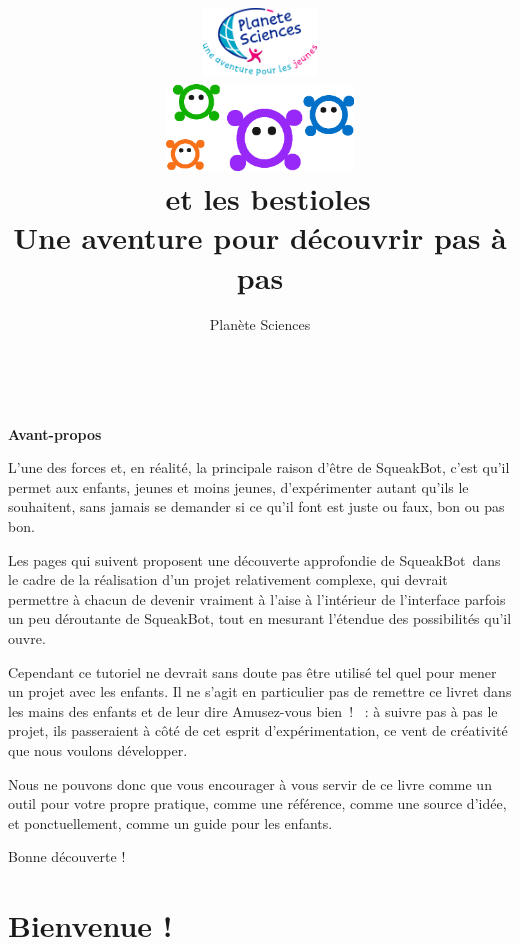 \documentclass[a4paper,12pt]{book}
\title{
	\includegraphics[width=3cm]{national.png}\\
	\vfill
	\includegraphics[width=5cm]{bestioles.png}\\
	\vspace{3em}
	\LARGE{\textbf{\appName~et les bestioles}}\\[1cm]
	\large{Une aventure pour découvrir pas à pas \appName}\\[1cm]
	\vfill
}
\author{
Planète Sciences
}
\def\appName{SqueakBot}
\begin{document}

\maketitle

\tableofcontents


\clearpage
\thispagestyle{empty}
~
\vfill
\begin{center}
    \LARGE{\textbf{Avant-propos}}
\end{center}

\vspace{3em}

L'une des forces et, en réalité, la principale raison d'être de \appName, c'est
qu'il permet aux enfants, jeunes et moins jeunes, d'expérimenter autant qu'ils
le souhaitent, sans jamais se demander si ce qu'il font est juste ou faux, bon
ou pas bon.

Les pages qui suivent proposent une découverte approfondie de \appName~dans le
cadre de la réalisation d'un projet relativement complexe, qui devrait
permettre à chacun de devenir vraiment à l'aise à l'intérieur de l'interface
parfois un peu déroutante de \appName, tout en mesurant l'étendue des
possibilités qu'il ouvre.

Cependant ce tutoriel ne devrait sans doute pas être utilisé tel quel pour
mener un projet avec les enfants. Il ne s'agit en particulier pas de remettre
ce livret dans les mains des enfants et de leur dire \og Amusez-vous bien~!
\fg~: à suivre pas à pas le projet, ils passeraient à côté de cet esprit
d'expérimentation, ce vent de créativité que nous voulons développer.

Nous ne pouvons donc que vous encourager à vous servir de ce livre comme un
outil pour votre propre pratique, comme une référence, comme une source d'idée,
et ponctuellement, comme un guide pour les enfants.

Bonne découverte !

\vfill

\chapter{Bienvenue !}
\end{document}
